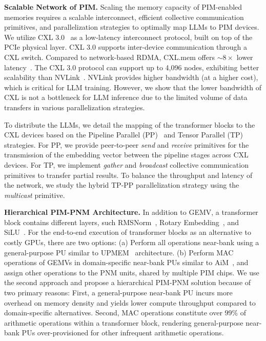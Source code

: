 
\textbf{Scalable Network of PIM.}
Scaling the memory capacity of PIM-enabled memories requires a scalable interconnect, efficient collective communication primitives, and parallelization strategies to optimally map LLMs to PIM devices.
We utilize CXL 3.0~\cite{CXL} as a low-latency interconnect protocol, built on top of the PCIe physical layer.
CXL 3.0 supports inter-device communication through a CXL switch.
Compared to network-based RDMA, CXL.mem offers ${\sim}8\times$ lower latency~\cite{gouk2022direct}.
The CXL 3.0 protocol can support up to 4,096 nodes, exhibiting better scalability than NVLink~\cite{nvlink}.
NVLink provides higher bandwidth (at a higher cost), which is critical for LLM training.
However, we show that the lower bandwidth of CXL is not a bottleneck for LLM inference due to the limited volume of data transfers in various parallelization strategies.

To distribute the LLMs, we detail the mapping of the transformer blocks to the CXL devices based on the Pipeline Parallel (PP)~\cite{megatron, alpa} and Tensor Parallel (TP)~\cite{gpipe} strategies.
For PP, we provide peer-to-peer \textit{send} and \textit{receive} primitives for the transmission of the embedding vector between the pipeline stages across CXL devices.
For TP, we implement \textit{gather} and \textit{broadcast} collective communication primitives to transfer partial results.
To balance the throughput and latency of the network, we study the hybrid TP-PP parallelization strategy using the \textit{multicast} primitive.

\textbf{Hierarchical PIM-PNM Architecture.}
In addition to GEMV, a transformer block contains different layers, such RMSNorm~\cite{rmsnorm-paper}, Rotary Embedding~\cite{rope-paper}, and SiLU~\cite{silu-paper}.
For the end-to-end execution of transformer blocks as an alternative to costly GPUs, there are two options:
(a) Perform all operations near-bank using a general-purpose PU similar to UPMEM~\cite{upmem} architecture.
(b) Perform MAC operations of GEMVs in domain-specific near-bank PUs similar to AiM~\cite{aim2}, and assign other operations to the PNM units, shared by multiple PIM chips.
We use the second approach and propose a hierarchical PIM-PNM solution because of two primary reasons:
First, a general-purpose near-bank PU incurs more overhead on memory density and yields lower compute throughput compared to domain-specific alternatives.
Second, MAC operations constitute over $99\%$ of arithmetic operations within a transformer block, rendering general-purpose near-bank PUs over-provisioned for other infrequent arithmetic operations.